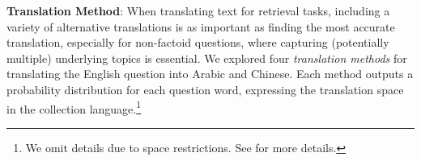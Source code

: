 \documentclass{sig-alternate-05-2015}
\begin{document}
\textbf{Translation Method}:
When translating text for retrieval tasks, including a variety of alternative translations is as important as finding the most accurate 
translation, especially for non-factoid questions, where capturing (potentially multiple) underlying topics is essential.
We explored four \emph{translation methods} for translating
the English question into Arabic and Chinese. Each method outputs a probability distribution for 
each question word, expressing the translation space in the collection language.\footnote{We omit details due to space 
restrictions. See \cite{Ture:2014aa} for more details.}

\end{document}
